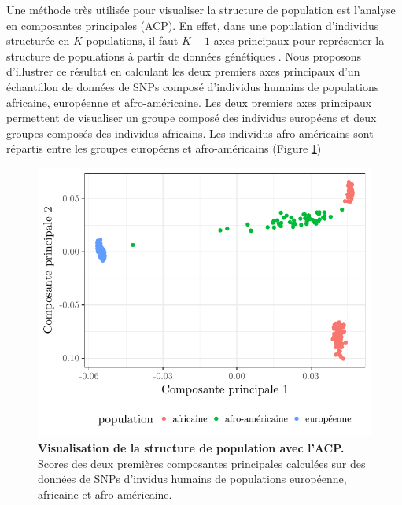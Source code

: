 \documentclass[12pt,a4paper,twoside]{ugathesis}
\begin{document}
Une méthode très utilisée pour visualiser la structure de population est
l'analyse en composantes principales (ACP). En effet, dans une population d'individus
structurée en \(K\) populations, il faut \(K-1\) axes principaux pour représenter la
structure de populations à partir de données génétiques \citep{Patterson_2006}.
Nous proposons d'illustrer ce résultat en calculant les deux premiers axes
principaux d'un échantillon de données de SNPs composé d'individus humains de
populations africaine, européenne et afro-américaine. Les deux premiers axes
principaux permettent de visualiser un groupe composé des individus européens et
deux groupes composés des individus africains. Les individus afro-américains
sont répartis entre les groupes européens et afro-américains (Figure
\ref{fig:tess3_intro_pca})

\begin{figure}[h]
\centering
\includegraphics{./OUTPUT/Rplots/tess3_intro_pca.pdf}
\caption{{\bf Visualisation de la structure de population avec l'ACP.} Scores
  des deux premières composantes principales calculées sur des données de SNPs
  d'invidus humains de populations européenne, africaine et afro-américaine.}
\label{fig:tess3_intro_pca}
\end{figure}
\end{document}
